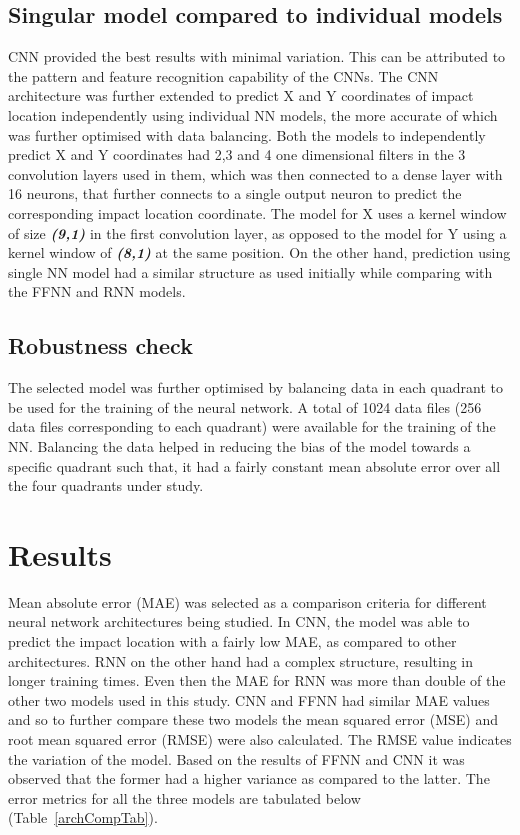 \documentclass[12pt]{article}
\begin{document}
\subsection{Singular model compared to individual models}
\par
CNN provided the best results with minimal variation. This can be attributed to the pattern and feature recognition capability of the CNNs. The CNN architecture was further extended to predict X and Y coordinates of impact location independently using individual NN models, the more accurate of which was further optimised with data balancing. Both the models to independently predict X and Y coordinates had 2,3 and 4 one dimensional filters in the 3 convolution layers used in them, which was then connected to a dense layer with 16 neurons, that further connects to a single output neuron to predict the corresponding impact location coordinate. The model for X uses a kernel window of size \emph{\textbf{(9,1)}} in the first convolution layer, as opposed to the model for Y using a kernel window of \emph{\textbf{(8,1)}} at the same position. On the other hand, prediction using single NN model had a similar structure as used initially while comparing with the FFNN and RNN models.

\par
\subsection{Robustness check}
\par
The selected model was further optimised by balancing data in each quadrant to be used for the training of the neural network. A total of 1024 data files (256 data files corresponding to each quadrant) were available for the training of the NN. Balancing the data helped in reducing the bias of the model towards a specific quadrant such that, it had a fairly constant mean absolute error over all the four quadrants under study.



\section{Results}

Mean absolute error (MAE) was selected as a comparison criteria for different neural network architectures being studied. In CNN, the model was able to predict the impact location with a fairly low MAE, as compared to other architectures. RNN on the other hand had a complex structure, resulting in longer training times. Even then the MAE for RNN was more than double of the other two models used in this study. CNN and FFNN had similar MAE values and so to further compare these two models the mean squared error (MSE) and root mean squared error (RMSE) were also calculated. The RMSE value indicates the variation of the model. Based on the results of FFNN and CNN it was observed that the former had a higher variance as compared to the latter. The error metrics for all the three models are tabulated below (Table~\ref{archCompTab}).
\end{document}
